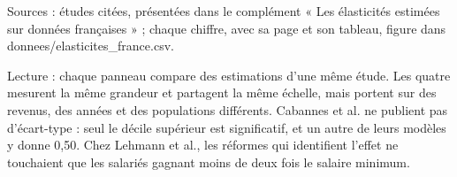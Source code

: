 Sources : études citées, présentées dans le complément « Les élasticités estimées sur données françaises » ; chaque chiffre, avec sa page et son tableau, figure dans donnees/elasticites\_france.csv.\par Lecture : chaque panneau compare des estimations d'une même étude. Les quatre mesurent la même grandeur et partagent la même échelle, mais portent sur des revenus, des années et des populations différents. Cabannes et al. ne publient pas d'écart-type : seul le décile supérieur est significatif, et un autre de leurs modèles y donne 0,50. Chez Lehmann et al., les réformes qui identifient l'effet ne touchaient que les salariés gagnant moins de deux fois le salaire minimum.
